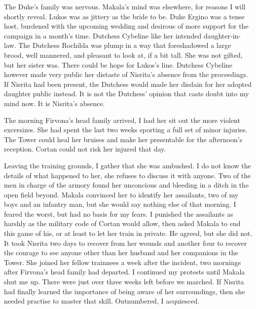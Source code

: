 \documentclass{article}
\begin{document}
The Duke's family was nervous. Makala's mind was elsewhere, for reasons I will shortly reveal. Lukos was as jittery as the bride to be. Duke Ergino was a tense host, burdened with the upcoming wedding and desirous of more support for the campaign in a month's time. Dutchess Cybeline like her intended daughter-in-law. The Dutchess Rochilda was plump in a way that foreshadowed a large brood, well mannered, and pleasant to look at, if a bit tall. She was not gifted, but her sister was. There could be hope for Lukos's line. Dutchess Cybeline however made very public her distaste of Nisrita's absence from the proceedings. If Nisrita had been present, the Dutchess would made her disdain for her adopted daughter public instead. It is not the Dutchess' opinion that casts doubt into my mind now. It is Nisrita's absence. 

The morning Firvona's head family arrived, I had her sit out the more violent excersizes. She had spent the last two weeks sporting a full set of minor injuries. The Tower could heal her bruises and make her presentable for the afternoon's reception. Cortan could not risk her injured that day. 

Leaving the training grounds, I gather that she was ambushed. I do not know the details of what happened to her, she refuses to discuss it with anyone. Two of the men in charge of the armory found her unconcious and bleeding in a ditch in the open field beyond. Makala convinced her to identify her assailants, two of my boys and an infantry man, but she would say nothing else of that morning. I feared the worst, but had no basis for my fears. I punished the assailants as harshly as the military code of Cortan would allow, then asked Makala to end this game of his, or at least to let her train in private. He agreed, but she did not. It took Nisrita two days to recover from her wounds and another four to recover the courage to see anyone other than her husband and her companions in the Tower. She joined her fellow trainnees a week after the incident, two mornings after Firvona's head family had departed. I continued my protests until Makala shut me up. There were just over three weeks left before we marched. If Nisrita had finally learned the importance of being aware of her surroundings, then she needed practise to master that skill. Outnumbered, I acquiesced.
\end{document}
